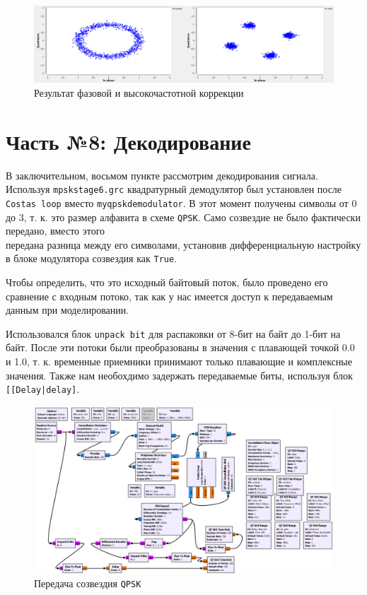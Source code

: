 \documentclass[a4paper]{article}
\begin{document}
            \begin{figure}[H]
                \centering
                \includegraphics[width=\textwidth]{ex_7_3.png}
                \caption{Результат фазовой и высокочастотной коррекции}
                \label{fig:ex_7_3}
            \end{figure}
            
    \newpage
        \section{Часть №8: Декодирование}
            В заключительном, восьмом пункте рассмотрим декодирования сигнала. Используя \texttt{mpskstage6.grc} квадратурный демодулятор был установлен после \\\texttt{Costas loop} вместо \texttt{myqpskdemodulator}. В этот момент получены символы от 0 до 3, т. к. это размер алфавита в схеме \texttt{QPSK}. Само созвездие не было фактически передано, вместо этого \\передана разница между его символами, установив дифференциальную настройку в блоке модулятора созвездия как \texttt{True}. 
            
            Чтобы определить, что это исходный байтовый поток, было проведено его сравнение с входным потоко, так как у нас имеется доступ к передаваемым данным при моделировании. 
            
            Использовался блок \texttt{unpack bit} для распаковки от 8-бит на байт до 1-бит на байт. После эти потоки были преобразованы в значения с плавающей точкой 0.0 и 1.0, т. к. временные приемники принимают только плавающие и комплексные значения. Также нам необохдимо задержать передаваемые биты, используя блок \texttt{[[Delay|delay]}.

             \begin{figure}[H]
                \centering
                \includegraphics[width=\textwidth]{ex_8_1.png}
                \caption{Передача созвездия \texttt{QPSK}}
                \label{fig:ex_8_1}
            \end{figure}
            
\end{document}
